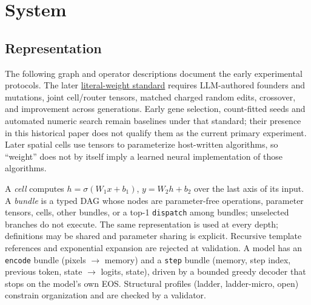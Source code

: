 \documentclass[11pt]{article}
\begin{document}
\section{System}\label{sec:system}
\subsection{Representation}
The following graph and operator descriptions document the early experimental protocols.
The later \href{https://github.com/Sanokei/CellForge/blob/02beaf18251fca5ed1f1eb55e92f00a3e3820e88/docs/ONE_STANDARD.md}{literal-weight standard} requires LLM-authored
founders and mutations, joint cell/router tensors, matched charged random edits, crossover,
and improvement across generations. Early gene selection, count-fitted seeds and automated
numeric search remain baselines under that standard; their presence in this historical paper
does not qualify them as the current primary experiment. Later spatial cells use tensors to
parameterize host-written algorithms, so ``weight'' does not by itself imply a learned neural
implementation of those algorithms.

A \emph{cell} computes $h=\sigma(W_1x+b_1)$, $y=W_2h+b_2$ over the last axis of its input.
A \emph{bundle} is a typed DAG whose nodes are parameter-free operations, parameter tensors,
cells, other bundles, or a top-1 \texttt{dispatch} among bundles; unselected branches do not
execute. The same representation is used at every depth; definitions may be shared and
parameter sharing is explicit. Recursive template references and exponential expansion are
rejected at validation. A model has an \texttt{encode} bundle (pixels $\to$ memory) and a
\texttt{step} bundle (memory, step index, previous token, state $\to$ logits, state), driven
by a bounded greedy decoder that stops on the model's own EOS. Structural profiles (ladder,
ladder-micro, open) constrain organization and are checked by a validator.
\end{document}

